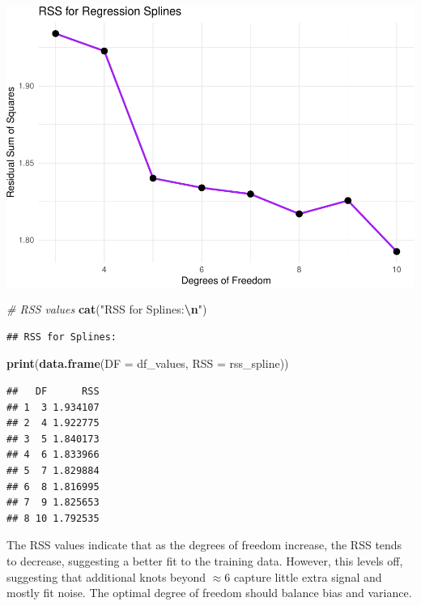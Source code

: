 \documentclass[
]{article}
\newenvironment{Shaded}{\begin{snugshade}}{\end{snugshade}}
\newcommand{\AttributeTok}[1]{\textcolor[rgb]{0.13,0.29,0.53}{#1}}
\newcommand{\CommentTok}[1]{\textcolor[rgb]{0.56,0.35,0.01}{\textit{#1}}}
\newcommand{\FunctionTok}[1]{\textcolor[rgb]{0.13,0.29,0.53}{\textbf{#1}}}
\newcommand{\NormalTok}[1]{#1}
\newcommand{\SpecialCharTok}[1]{\textcolor[rgb]{0.81,0.36,0.00}{\textbf{#1}}}
\newcommand{\StringTok}[1]{\textcolor[rgb]{0.31,0.60,0.02}{#1}}
\begin{document}
\includegraphics{chapter-07-hw_files/figure-latex/unnamed-chunk-8-1.pdf}

\begin{Shaded}
\begin{Highlighting}[]
\CommentTok{\# RSS values}
\FunctionTok{cat}\NormalTok{(}\StringTok{"RSS for Splines:}\SpecialCharTok{\textbackslash{}n}\StringTok{"}\NormalTok{)}
\end{Highlighting}
\end{Shaded}

\begin{verbatim}
## RSS for Splines:
\end{verbatim}

\begin{Shaded}
\begin{Highlighting}[]
\FunctionTok{print}\NormalTok{(}\FunctionTok{data.frame}\NormalTok{(}\AttributeTok{DF =}\NormalTok{ df\_values, }\AttributeTok{RSS =}\NormalTok{ rss\_spline))}
\end{Highlighting}
\end{Shaded}

\begin{verbatim}
##   DF      RSS
## 1  3 1.934107
## 2  4 1.922775
## 3  5 1.840173
## 4  6 1.833966
## 5  7 1.829884
## 6  8 1.816995
## 7  9 1.825653
## 8 10 1.792535
\end{verbatim}

The RSS values indicate that as the degrees of freedom increase, the RSS
tends to decrease, suggesting a better fit to the training data.
However, this levels off, suggesting that additional knots beyond
\(\approx 6\) capture little extra signal and mostly fit noise. The
optimal degree of freedom should balance bias and variance.
\end{document}
